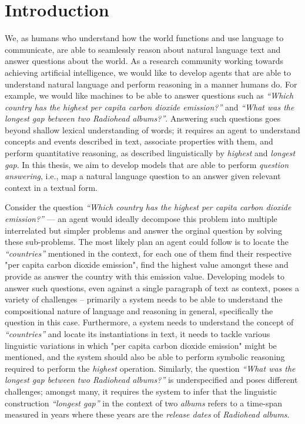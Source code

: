 \documentclass[main.tex]{subfiles}
\begin{document}
\section{Introduction} %
\label{sec:introduction}

We, as humans who understand how the world functions and  use language to communicate, are able to seamlessly reason about natural language text and answer questions about the world.  As a research community working towards achieving artificial intelligence, we would like to develop agents that are able to understand natural language and perform reasoning in a manner humans do.  For example, we would like machines to be able to answer questions such as \textit{``Which country has the highest per capita carbon dioxide emission?''} and \textit{``What was the longest gap between two Radiohead albums?''}.  Answering such questions goes beyond shallow lexical understanding of words; it requires an agent to understand concepts and events described in text, associate properties with them, and perform quantitative reasoning, as described linguistically by \textit{highest} and \textit{longest gap}.  In this thesis, we aim to develop models that are able to perform \textit{question answering}, i.e., map a natural language question to an answer given relevant context in a textual form.

Consider the question \textit{``Which country has the highest per capita carbon dioxide emission?''} --- an agent would ideally decompose this problem into multiple interrelated but simpler problems and answer the orginal question by solving these sub-problems.  The most likely plan an agent could follow is to locate the \textit{``countries''} mentioned in the context, for each one of them find their respective "per capita carbon dioxide emission", find the highest value amongst these and provide as answer the country with this emission value.  Developing models to answer such questions, even against a single paragraph of text as context, poses a variety of challenges -- primarily a system needs to be able to understand the compositional nature of language and reasoning in general, specifically the question in this case. Furthermore, a system needs to understand the concept of \textit{``countries''} and locate its instantiations in text, it needs to tackle various linguistic variations in which "per capita carbon dioxide emission" might be mentioned, and the system should also be able to perform symbolic reasoning required to perform the \textit{highest} operation.  Similarly, the question \textit{``What was the longest gap between two Radiohead albums?''} is underspecified and poses different challenges; amongst many, it requires the system to infer that the linguistic construction \textit{``longest gap''} in the context of two \textit{albums} refers to a time-span measured in years where these years are the \textit{release dates} of \textit{Radiohead albums}.
\end{document}
